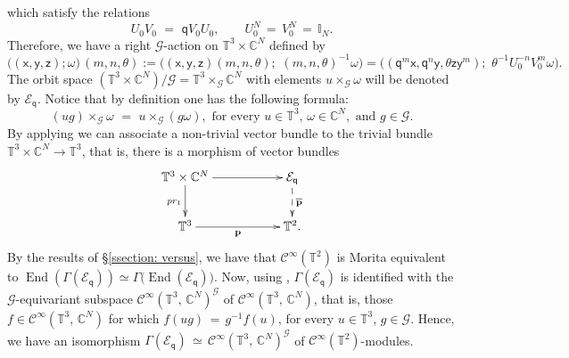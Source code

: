 \documentclass[reqno, a4paper, 10pt]{amsart}
\numberwithin{equation}{section}
\theoremstyle{plain}
\theoremstyle{definition}
\theoremstyle{remark}
\begin{document}
which satisfy the relations
\begin{equation}\label{Eq:quantum}
U_0V_0\,\,=\,\, {\mathsf{{q}}} V_0U_0,\qquad U_0^N\,=\, V_0^N\,=\, \mathbb{I}_N.
\end{equation}
Therefore, we have  a right ${{\mathcal G}}$-action on $\mathbb{T}^3\times \mathbb{C}^N$ defined by
$$
 \big( ({\mathsf{{x}}},{\mathsf{{y}}},{\mathsf{{z}}}); \omega\big)\, (m,n,\theta) := \Big( ({\mathsf{{x}}},  {\mathsf{{y}}},  {\mathsf{{z}}})(m,n,\theta);\,\, (m,n,\theta)^{-1} \omega  \Big)= 
\Big( ({\mathsf{{q}}}^m{\mathsf{{x}}}, {\mathsf{{q}}}^n {\mathsf{{y}}}, \theta {\mathsf{{z}}}{\mathsf{{y}}}^m);\,\, \theta^{-1}U_0^{-n}V_0^{m}\omega \Big).
$$
The orbit space $(\mathbb{T}^3\times \mathbb{C}^N)/{{\mathcal G}} = \mathbb{T}^3\times_{{\mathcal G}} \mathbb{C}^N$ with elements $u\times_{{\mathcal G}}\omega$ will be denoted by ${{\mathcal E}}_{{\mathsf{{q}}}}$. Notice that by definition one has the following formula:
$$
(ug) \times_{{\mathcal G}}\omega \,\,=\,\, u\times_{{\mathcal G}} (g \omega), \text{ for every } u \in \mathbb{T}^3,\, \omega \in \mathbb{C}^N
, \text{ and } g \in {{\mathcal G}}.
$$
By applying \cite[Theorem 10.7, \S10.11]{Kolar/Michor/Slovak:1993} we can associate a 
non-trivial vector bundle to the trivial bundle $\mathbb{T}^3 \times \mathbb{C}^N \to \mathbb{T}^3$, that is, 
there is a morphism of vector bundles
\begin{equation}\label{Eq:Eqp}
\xymatrix{  \mathbb{T}^3 \times \mathbb{C}^N  \ar@{->}[rr] \ar@{->}_{pr_1}[d] & &  {{\mathcal E}}_{{\mathsf{{q}}}}  
\ar@{-->}^-{{\overline{{\bf p}}}}[d]  \\ \mathbb{T}^3 \ar@{->}_-{{\bf p}}[rr] & & \mathbb{T}^2.}
\end{equation}
By the results of \S\ref{ssection: versus}, we have that ${{\mathcal C}}^{\infty}(\mathbb{T}^2)$ 
is Morita equivalent to 
${\operatorname{End}({\Gamma({{\mathcal E}}_{{\mathsf{{q}}}})})} \simeq \Gamma\big( {\operatorname{End}({{{\mathcal E}}_{{\mathsf{{q}}}}})} \big)$. 
Now, using \cite[Theorem 10.12]{Kolar/Michor/Slovak:1993}, 
$\Gamma({{\mathcal E}}_{{\mathsf{{q}}}})$ is identified with the ${{\mathcal G}}$-equivariant subspace  ${{\mathcal C}}^{\infty}(\mathbb{T}^3,\, \mathbb{C}^N)^{{\mathcal G}}$ of 
${{\mathcal C}}^{\infty}(\mathbb{T}^3,\, \mathbb{C}^N)$, that is, those $f \in {{\mathcal C}}^{\infty}(\mathbb{T}^3,\, \mathbb{C}^N)$ for which 
$f(ug)\,=\, g^{-1} f(u) $, for every  $u \in \mathbb{T}^3$, $g \in {{\mathcal G}}$.
Hence, we have an isomorphism  $\Gamma({{\mathcal E}}_{{\mathsf{{q}}}})\, \simeq \, {{\mathcal C}}^{\infty}(\mathbb{T}^3,\, \mathbb{C}^N)^{{\mathcal G}}$ of ${{\mathcal C}}^{\infty}(\mathbb{T}^2)$-modules.
\end{document}
